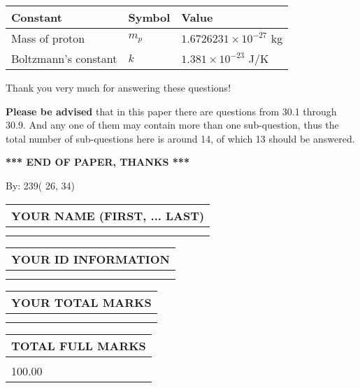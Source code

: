 \documentclass[12pt]{article}
\begin{document}
 
\noindent\begin{tabular}{|l|l|l|}
\hline
Constant & Symbol & Value \\
\hline
 
Mass of proton &
$m_p$ &
 $ 1.6726231 \times 10^{-27} $
kg \\
\hline
 
Boltzmann's constant &
$k$ &
 $ 1.381 \times 10^{-23} $
J/K \\
\hline
 
\end{tabular}
 
Thank you very much for answering these questions!
 
{\textbf{\large{Please be advised}}} that in this paper there are questions from
30.1 through
30.9.
And any one of them may contain more than one sub-question, thus the total number
of sub-questions here is around 14, of which
13 should be answered.
 
   
   
   
   
\vspace{1.0in} 
{\textbf{\large{ *** END OF PAPER, THANKS *** }}} 
   
   
\hspace{1.0in} By: 
         239(         26,          34)
   
   
   
   
\newpage 
\setcounter{page}{ 
    31001 } 
   
   
   
   
\noindent\begin{tabular}{|l|}
\hline
YOUR NAME (FIRST, ... LAST)  \\
\hline
 \\ 
 \\ 
\hline
\end{tabular}
\hspace{0.05in} \begin{tabular}{|l|}
\hline
 YOUR   ID   INFORMATION  \\
\hline
 \\ 
 \\ 
\hline
\end{tabular}
   
   
\vspace{0.2in}\noindent\begin{tabular}{|l|}
\hline
YOUR TOTAL MARKS  \\
\hline
 \\ 
 \\ 
\hline
\end{tabular}
\hspace{0.05in} \begin{tabular}{|l|}
\hline
TOTAL FULL MARKS  \\
\hline
 \\ 
100.00 \\
\hline
\end{tabular}
   
\end{document}
